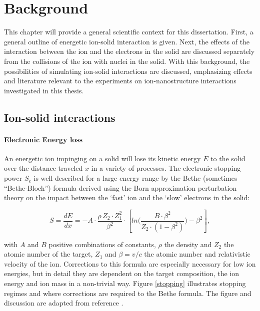 \chapter{Background}

This chapter will provide a general scientific context for this dissertation. First, a general outline of energetic ion-solid interaction is given. Next, the effects of the interaction between the ion and the electrons in the solid are discussed separately from the collisions of the ion with nuclei in the solid. With this background, the possibilities of simulating ion-solid interactions are discussed, emphasizing effects and literature relevant to the experiments on ion-nanostructure interactions investigated in this thesis. 

\section{Ion-solid interactions}
\label{sec:ionsolid}

\subsubsection{Electronic Energy loss}

An energetic ion impinging on a solid will lose its kinetic energy $E$ to the solid over the distance traveled $x$ in a variety of processes. The electronic stopping power $S_e$ is well described for a large energy range by the Bethe (sometimes ``Bethe-Bloch'') formula \cite{bethe_zur_1930,bloch_zur_1933} derived using the Born approximation perturbation theory on the impact between the `fast' ion and the `slow' electrons in the solid: 

\begin{equation}
S = \frac{dE}{dx} = - A \cdot \frac{\rho\,Z_2\cdot Z_1^2}{\beta^2} \cdot \left[ln\Big(\frac{B\cdot\beta^2}{Z_2\cdot(1-\beta^2)}\Big)-\beta^2\right] ,
\end{equation}


with $A$ and $B$ positive combinations of constants, $\rho$ the density and $Z_2$ the atomic number of the target, $Z_1$ and $\beta = v/c$ the atomic number and relativistic velocity of the ion. Corrections to this formula are especially necessary for low ion energies, but in detail they are dependent on the target composition, the ion energy and ion mass in a non-trivial way. Figure \ref{stopping} illustrates stopping regimes and where corrections are required to the Bethe formula. The figure and discussion are adapted from reference \cite{sigmund_stopping_2004}.

